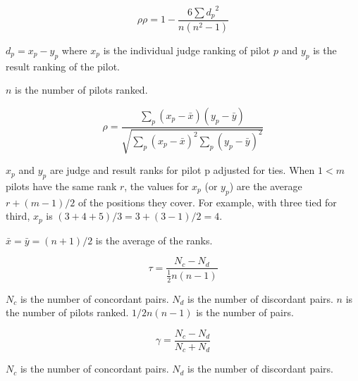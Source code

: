 \documentclass[12pt]{report}
\begin{document}
\[
\rho\rho = 1- {\frac {6 \sum {d_p}^2}{n(n^2 - 1)}}
\]

$d_p = x_p - y_p$ where $x_p$ is the individual judge ranking of pilot $p$ and $y_p$
is the result ranking of the pilot.

$n$ is the number of pilots ranked.

\[
 \rho = \frac{\sum_p(x_p-\bar{x})(y_p-\bar{y})}{\sqrt{\sum_p (x_p-\bar{x})^2 \sum_p(y_p-\bar{y})^2}}
\]

$x_p$ and $y_p$ are judge and result ranks for pilot p adjusted for ties.  
When $1 < m$ pilots have the same rank $r$, 
the values for $x_p$ (or $y_p$) are the average $r + (m - 1)/2$ 
of the positions they cover.  For example, with three tied for
third, $x_p$ is $(3+4+5)/3 = 3 + (3-1)/2 = 4$.

$\bar{x} = \bar{y} = (n+1)/2$ is the average of the ranks.

\[
\tau = \frac{N_c-N_d}{\frac{1}{2} n (n-1) }
\]

$N_c$ is the number of concordant pairs.  $N_d$ is the number of
discordant pairs.  $n$ is the number of pilots ranked.
${1/2}n(n-1)$ is the number of pairs.

\[
\gamma=\frac{N_c-N_d}{N_c+N_d}
\]

$N_c$ is the number of concordant pairs.  $N_d$ is the number of
discordant pairs.
\end{document}
